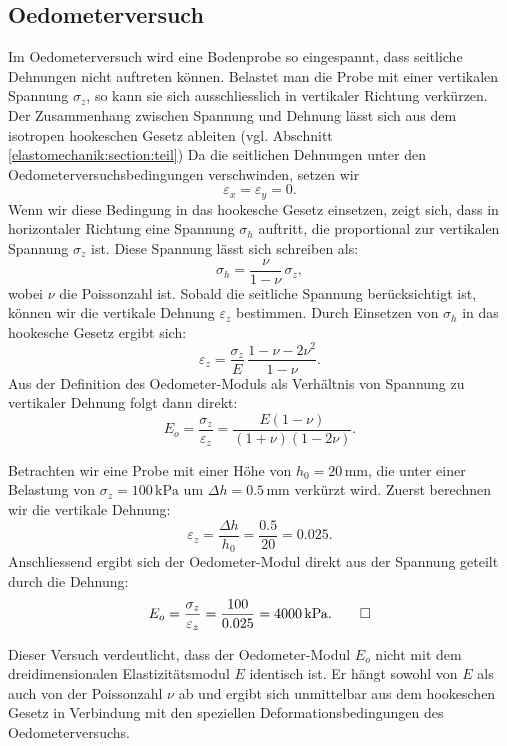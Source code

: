 \subsection{Oedometerversuch}
Im Oedometerversuch wird eine Bodenprobe so eingespannt, dass seitliche Dehnungen nicht auftreten können. 
Belastet man die Probe mit einer vertikalen Spannung \(\sigma_z\), so kann sie sich ausschliesslich in vertikaler Richtung verkürzen.  
Der Zusammenhang zwischen Spannung und Dehnung lässt sich aus dem isotropen hookeschen Gesetz ableiten (vgl. Abschnitt \ref{elastomechanik:section:teil})
Da die seitlichen Dehnungen unter den Oedometerversuchsbedingungen verschwinden, setzen wir
\[
  \varepsilon_x = \varepsilon_y = 0.
\]
Wenn wir diese Bedingung in das hookesche Gesetz einsetzen, zeigt sich, dass in horizontaler Richtung eine Spannung \(\sigma_h\) auftritt, die proportional zur vertikalen Spannung \(\sigma_z\) ist. 
Diese Spannung lässt sich schreiben als:
\[
  \sigma_h = \frac{\nu}{1-\nu}\,\sigma_z,
\]
wobei \(\nu\) die Poissonzahl ist.  
Sobald die seitliche Spannung berücksichtigt ist, können wir die vertikale Dehnung \(\varepsilon_z\) bestimmen. 
Durch Einsetzen von \(\sigma_h\) in das hookesche Gesetz ergibt sich:
\[
  \varepsilon_z = \frac{\sigma_z}{E}\,\frac{1-\nu-2\nu^2}{1-\nu}.
\]
Aus der Definition des Oedometer-Moduls als Verhältnis von Spannung zu vertikaler Dehnung folgt dann direkt:
\[
  E_o = \frac{\sigma_z}{\varepsilon_z} = \frac{E(1-\nu)}{(1+\nu)(1-2\nu)}.
\]
\begin{beispiel}   
Betrachten wir eine Probe mit einer Höhe von \(h_0 = 20\,\mathrm{mm}\), die unter einer Belastung von \(\sigma_z = 100\,\mathrm{kPa}\) um \(\Delta h = 0.5\,\mathrm{mm}\) verkürzt wird.  
Zuerst berechnen wir die vertikale Dehnung:
\[
  \varepsilon_z = \frac{\Delta h}{h_0} = \frac{0.5}{20} = 0.025.
\]
Anschliessend ergibt sich der Oedometer-Modul direkt aus der Spannung geteilt durch die Dehnung:
\[
  E_o = \frac{\sigma_z}{\varepsilon_z} = \frac{100}{0.025} = 4000\,\mathrm{kPa}.
\qedhere
\]
\end{beispiel}  
Dieser Versuch verdeutlicht, dass der Oedometer-Modul \(E_o\) nicht mit dem dreidimensionalen Elastizitätsmodul \(E\) identisch ist. 
Er hängt sowohl von \(E\) als auch von der Poissonzahl \(\nu\) ab und ergibt sich unmittelbar aus dem hookeschen Gesetz in Verbindung mit den speziellen Deformationsbedingungen des Oedometerversuchs.
